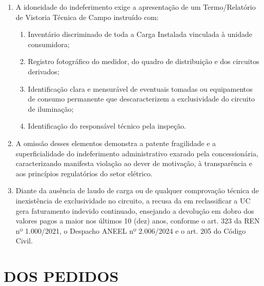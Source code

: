 \begin{enumerate}[resume]
    \item A idoneidade do indeferimento exige a apresentação de um Termo/Relatório de Vistoria Técnica de Campo instruído com:
    \begin{enumerate}
        \item Inventário discriminado de toda a Carga Instalada vinculada à unidade consumidora;
        \item Registro fotográfico do medidor, do quadro de distribuição e dos circuitos derivados;
        \item Identificação clara e mensurável de eventuais tomadas ou equipamentos de consumo permanente que descaracterizem a exclusividade do circuito de iluminação;
        \item Identificação do responsável técnico pela inspeção.
    \end{enumerate}

    \item A omissão desses elementos demonstra a patente fragilidade e a superficialidade do indeferimento administrativo exarado pela concessionária, caracterizando manifesta violação ao dever de motivação, à transparência e aos princípios regulatórios do setor elétrico.

    \item Diante da ausência de laudo de carga ou de qualquer comprovação técnica de inexistência de exclusividade no circuito, a recusa da \nomeConcessionaria{} em reclassificar a UC \unidadeConsumidora{} gera faturamento indevido continuado, ensejando a devolução em dobro dos valores pagos a maior nos últimos 10 (dez) anos, conforme o art. 323 da REN nº 1.000/2021, o Despacho ANEEL nº 2.006/2024 e o art. 205 do Código Civil.
\end{enumerate}

\section{DOS PEDIDOS}

